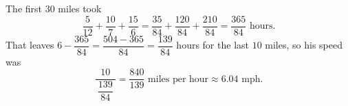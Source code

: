 The first $30$ miles took
\[\dfrac{5}{12}+\dfrac{10}{7}+\dfrac{15}{6}=\dfrac{35}{84}+\dfrac{120}{84}+\dfrac{210}{84}=\dfrac{365}{84}\text{ hours}.\]
That leaves $6-\dfrac{365}{84}=\dfrac{504-365}{84}=\dfrac{139}{84}$ hours for the last $10$ miles, so his speed was
\[\dfrac{10}{\ \dfrac{139}{84}\ }=\boxed{\dfrac{840}{139}}\text{ miles per hour}\approx6.04\text{ mph}.\]
